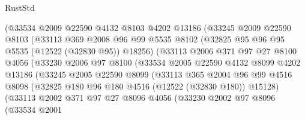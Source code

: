 \begin{lexlean}{RustStd}
\begin{coremodule}
                        (@33534
                          @2009
                          @22590
                          @4132
                          @8103
                          @4202
                          @13186
                          (@33245
                            @2009
                            @22590
                            @8103
                            (@33113
                              @369
                              @2008
                              @96
                              @99
                              @5535
                              @8102
                              (@32825 @95 @96 @95 @5535 (@12522 (@32830 @95)) @18256)
                              (@33113
                                @2006
                                @371
                                @97
                                @27
                                @8100
                                @4056
                                (@33230
                                  @2006
                                  @97
                                  @8100
                                  (@33534
                                    @2005
                                    @22590
                                    @4132
                                    @8099
                                    @4202
                                    @13186
                                    (@33245
                                      @2005
                                      @22590
                                      @8099
                                      (@33113
                                        @365
                                        @2004
                                        @96
                                        @99
                                        @4516
                                        @8098
                                        (@32825 @180 @96 @180 @4516 (@12522 (@32830 @180)) @15128)
                                        (@33113
                                          @2002
                                          @371
                                          @97
                                          @27
                                          @8096
                                          @4056
                                          (@33230
                                            @2002
                                            @97
                                            @8096
                                            (@33534
                                              @2001

\end{coremodule}
\end{lexlean}
